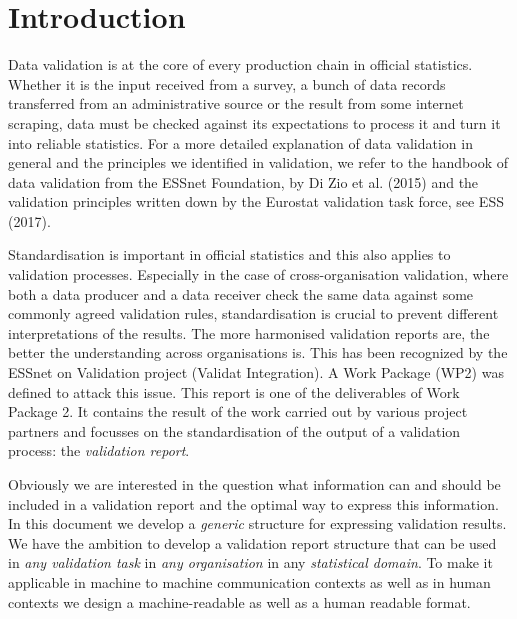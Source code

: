 \section{Introduction}
\label{sect:introduction}

Data validation is at the core of every production chain in official statistics.
Whether it is the input received from a survey, a bunch of data records transferred from an administrative source or the result from some internet scraping,
data must be checked against its expectations to process it and turn it into reliable statistics.
For a more detailed explanation of data validation in general and the principles we identified in validation, we refer to the 
handbook of data validation from the ESSnet Foundation, by Di Zio et al. (2015) and the validation principles written down by the Eurostat validation task force, see ESS (2017).

Standardisation is important in official statistics and this also applies to validation processes.
Especially in the case of cross-organisation validation, where both a data producer and a data receiver check the same data against some
commonly agreed validation rules, standardisation is crucial to prevent different interpretations of the results.
The more harmonised validation reports are, the better the understanding across organisations is.
This has been recognized by the ESSnet on Validation project (Validat Integration).
A Work Package (WP2) was defined to attack this issue.
This report is one of the deliverables of Work Package 2.
It contains the result of the work carried out by various project partners and focusses on the standardisation of the output of a validation process: the \emph{validation report}.

Obviously we are interested in the question what information can and should be included in a validation report and the optimal way to express this information.
In this document we develop a \emph{generic} structure for expressing validation results.
We have the ambition to develop a validation report structure that can be used in \emph{any validation task} in \emph{any organisation} in any \emph{statistical domain}. 
To make it applicable in machine to machine communication contexts as well as in human contexts we design a machine-readable as well as a human readable format.

